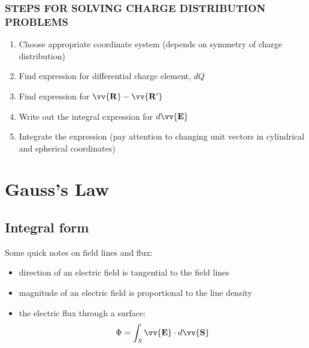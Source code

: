 \documentclass[10pt]{article}
\begin{document}
\subsubsection{STEPS FOR SOLVING CHARGE DISTRIBUTION PROBLEMS}
\begin{enumerate}
    \item Choose appropriate coordinate system (depends on symmetry of charge distribution)
    \item Find expression for differential charge element, $dQ$
    \item Find expression for $\vv{\mathbf{R}} - \vv{\mathbf{R'}}$ 
    \item Write out the integral expression for $d \vv{\mathbf{E}}$
    \item Integrate the expression (pay attention to changing unit vectors in cylindrical and spherical coordinates)
\end{enumerate}



\section{Gauss's Law}

\subsection{Integral form}
Some quick notes on field lines and flux:
\begin{itemize}
    \item direction of an electric field is tangential to the field lines
    \item magnitude of an electric field is proportional to the line density
    \item the electric flux through a surface:
        \begin{align}
            \Phi = \int_S \vv{\mathbf{E}} \cdot d \vv{\mathbf{S}}            
        \end{align}
\end{itemize}
\end{document}
